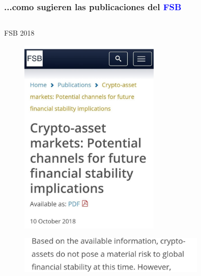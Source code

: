 \begin{frame}
\frametitle{...como sugieren las publicaciones del \textcolor{blue}{FSB}}

\begin{columns}
    \begin{column}{0.5\textwidth}
        \begin{block}{FSB 2018}
        
    
         \begin{figure}[H]
        \begin{center}
         \includegraphics[width=0.6\textwidth]{images/C1/FSB 2018a}
         \end{center}
        \end{figure}
            \begin{figure}[H]
        \begin{center}
         \includegraphics[width=0.8\textwidth]{images/C1/FSB 2018b}
         \end{center}
        \end{figure}
    \end{block}
    
    

\end{column}
\end{columns}
\end{frame}
